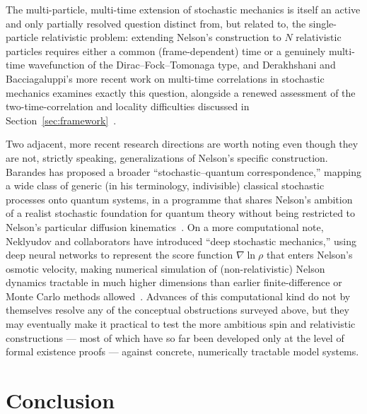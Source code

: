 \documentclass[11pt]{article}
\begin{document}
The multi-particle, multi-time extension of stochastic mechanics is itself an
active and only partially resolved question distinct from, but related to, the
single-particle relativistic problem: extending Nelson's construction to $N$
relativistic particles requires either a common (frame-dependent) time or a
genuinely multi-time wavefunction of the Dirac--Fock--Tomonaga type, and
Derakhshani and Bacciagaluppi's more recent work on multi-time correlations in
stochastic mechanics examines exactly this question, alongside a renewed
assessment of the two-time-correlation and locality difficulties discussed in
Section~\ref{sec:framework}~\cite{derakhshanibacciagaluppi22}.

Two adjacent, more recent research directions are worth noting even though they
are not, strictly speaking, generalizations of Nelson's specific construction.
Barandes has proposed a broader ``stochastic--quantum correspondence,'' mapping
a wide class of generic (in his terminology, indivisible) classical stochastic
processes onto quantum systems, in a programme that shares Nelson's ambition of
a realist stochastic foundation for quantum theory without being restricted to
Nelson's particular diffusion kinematics~\cite{barandes23}. On a more
computational note, Neklyudov and collaborators have introduced ``deep
stochastic mechanics,'' using deep neural networks to represent the score
function $\nabla\ln\rho$ that enters Nelson's osmotic velocity, making
numerical simulation of (non-relativistic) Nelson dynamics tractable in much
higher dimensions than earlier finite-difference or Monte Carlo methods
allowed~\cite{neklyudov23}. Advances of this computational kind do not by
themselves resolve any of the conceptual obstructions surveyed above, but they
may eventually make it practical to test the more ambitious spin and
relativistic constructions --- most of which have so far been developed only at
the level of formal existence proofs --- against concrete, numerically
tractable model systems.

\section{Conclusion}
\end{document}

